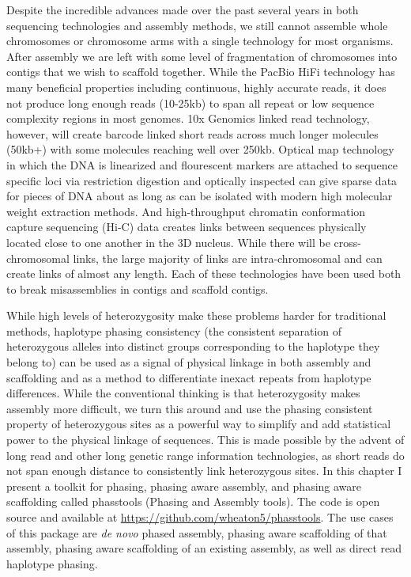 \par{
Despite the incredible advances made over the past several years in both sequencing technologies and assembly methods, we still cannot assemble whole chromosomes or chromosome arms with a 
single technology for most organisms. After assembly we are left with some level of fragmentation of chromosomes into contigs that we wish to scaffold together. While the 
PacBio HiFi technology has many beneficial properties including continuous, highly accurate reads, it does not produce long enough reads (10-25kb) to span all repeat or low sequence complexity regions in most genomes.
 10x Genomics linked read technology, however, will create barcode linked short reads across much longer molecules (50kb+) with some molecules reaching well over 250kb\cite{10xlinked}. Optical map technology in which the DNA is linearized and flourescent markers are attached to sequence specific loci via restriction digestion and optically inspected can give sparse data for pieces of DNA about as long as can be isolated with modern high molecular weight extraction methods\cite{opticalmaps1}. And high-throughput chromatin conformation capture sequencing (Hi-C) data creates links between sequences physically located close to one another in the 3D nucleus. While there will be cross-chromosomal links, the large majority of links are intra-chromosomal and can create links of almost any length\cite{3CHIC}\cite{hic2}. Each of these technologies have been used both to break misassemblies in contigs and scaffold contigs\cite{scaff10x}\cite{opticalmaphuman}\cite{hicscafffirst}\cite{SALSA}\cite{GRAAL}\cite{instaGRAAL}. 
} 

\par{
While high levels of heterozygosity make these problems harder for traditional methods, haplotype phasing consistency (the consistent separation of heterozygous alleles into distinct groups corresponding to the haplotype they belong to) can be used as a signal of physical linkage in both assembly and scaffolding and as a method to differentiate inexact repeats from haplotype differences. While the conventional thinking is that heterozygosity makes assembly more difficult, we turn this around and use the phasing consistent property of heterozygous sites as a powerful way to simplify and add statistical power to the physical linkage of sequences. This is made possible by the advent of long read and other long genetic range information technologies, as short reads do not span enough distance to consistently link heterozygous sites. In this chapter I present a toolkit for phasing, phasing aware assembly, and phasing aware scaffolding called phasstools (Phasing and Assembly tools). The code is open source and available at \href{https://github.com/wheaton5/phasstools}{https://github.com/wheaton5/phasstools}. The use cases of this package are \textit{de novo} phased assembly, phasing aware scaffolding of that assembly, phasing aware scaffolding of an existing assembly, as well as direct read haplotype phasing.
}

